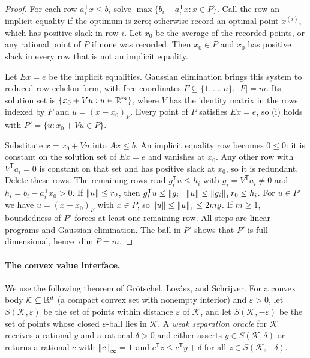 \begin{proof}
For each row $a_i^{\mathsf T}x\le b_i$ solve
$\max\{b_i-a_i^{\mathsf T}x:x\in P\}$. Call the row an implicit equality
if the optimum is zero; otherwise record an optimal point $x^{(i)}$, which
has positive slack in row $i$. Let $x_0$ be the average of the recorded
points, or any rational point of $P$ if none was recorded. Then $x_0\in P$
and $x_0$ has positive slack in every row that is not an implicit equality.

Let $Ex=e$ be the implicit equalities. Gaussian elimination brings this
system to reduced row echelon form, with free coordinates
$F\subseteq\{1,\ldots,n\}$, $|F|=m$. Its solution set is
$\{x_0+Vu:u\in\mathbb R^m\}$, where $V$ has the identity matrix in the rows
indexed by $F$ and $u=(x-x_0)_F$. Every point of $P$ satisfies $Ex=e$, so
(i) holds with $P'=\{u:x_0+Vu\in P\}$.

Substitute $x=x_0+Vu$ into $Ax\le b$. An implicit equality row becomes
$0\le0$: it is constant on the solution set of $Ex=e$ and vanishes at
$x_0$. Any other row with $V^{\mathsf T}a_i=0$ is constant on that set and
has positive slack at $x_0$, so it is redundant. Delete these rows. The
remaining rows read $g_i^{\mathsf T}u\le h_i$ with $g_i=V^{\mathsf T}a_i\ne0$
and $h_i=b_i-a_i^{\mathsf T}x_0>0$. If $\left\lVert u\right\rVert\le r_0$, then
$g_i^{\mathsf T}u\le\left\lVert g_i\right\rVert\,\left\lVert u\right\rVert\le\left\lVert g_i\right\rVert_1r_0\le h_i$. For
$u\in P'$ we have $u=(x-x_0)_F$ with $x\in P$, so
$\left\lVert u\right\rVert\le\left\lVert u\right\rVert_1\le2m\varrho$. If $m\ge1$, boundedness of $P'$ forces at
least one remaining row. All steps are linear programs and Gaussian
elimination. The ball in $P'$ shows that $P'$ is full dimensional, hence
$\dim P=m$.
\end{proof}

\paragraph{The convex value interface.}
We use the following theorem of Gr\"otschel, Lov\'asz, and Schrijver. For
a convex body $\mathcal K\subseteq\mathbb R^d$ (a compact convex set with nonempty
interior) and $\varepsilon>0$, let $S(\mathcal K,\varepsilon)$ be the set
of points within distance $\varepsilon$ of $\mathcal K$, and let
$S(\mathcal K,-\varepsilon)$ be the set of points whose closed
$\varepsilon$-ball lies in $\mathcal K$. A \emph{weak separation oracle}
for $\mathcal K$ receives a rational $y$ and a rational $\delta>0$ and
either asserts $y\in S(\mathcal K,\delta)$ or returns a rational $c$ with
$\left\lVert c\right\rVert_\infty=1$ and $c^{\mathsf T}z\le c^{\mathsf T}y+\delta$ for all
$z\in S(\mathcal K,-\delta)$.


